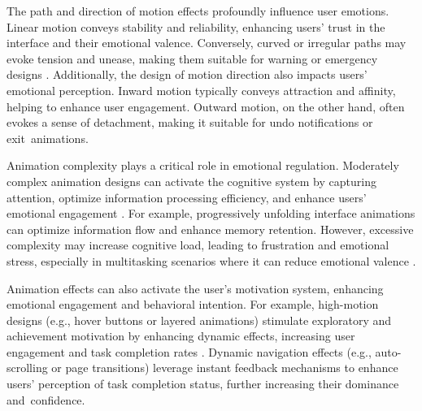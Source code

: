 The path and direction of motion effects profoundly influence user emotions. Linear motion conveys stability and reliability, enhancing users’ trust in the interface and their emotional valence. Conversely, curved or irregular paths may evoke tension and unease, making them suitable for warning or emergency designs \cite{lockyer2012affective}. Additionally, the design of motion direction also impacts users’ emotional perception. Inward motion typically conveys attraction and affinity, helping to enhance user engagement. Outward motion, on the other hand, often evokes a sense of detachment, making it suitable for undo notifications or exit~animations\cite{lockyer2012affective}.

Animation complexity plays a critical role in emotional regulation. Moderately complex animation designs can activate the cognitive system by capturing attention, optimize information processing efficiency, and enhance users’ emotional engagement \cite{yoo2005processing}. For example, progressively unfolding interface animations can optimize information flow and enhance memory retention. However, excessive complexity may increase cognitive load, leading to frustration and emotional stress, especially in multitasking scenarios where it can reduce emotional valence \cite{hanjalic2005affective}.

Animation effects can also activate the user’s motivation system, enhancing emotional engagement and behavioral intention. For example, high-motion designs (e.g., hover buttons or layered animations) stimulate exploratory and achievement motivation by enhancing dynamic effects, increasing user engagement and task completion rates \cite{wollner2018slow}. Dynamic navigation effects (e.g., auto-scrolling or page transitions) leverage instant feedback mechanisms to enhance users’ perception of task completion status, further increasing their dominance and~confidence.

